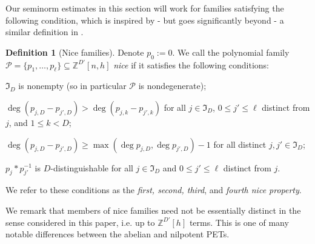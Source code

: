 \documentclass[11pt]{amsart}
\theoremstyle{definition}
\newtheorem{definition}[lemma]{Definition}
\newcommand{\Z}{{\mathbb Z}}
\newcommand{\CP}{{\mathcal P}}
\newcommand{\FI}{{\mathfrak I}}
\newcommand{\1}{{\mathbf{1}}}
\begin{document}
Our seminorm estimates in this section will work for families satisfying the following condition, which is inspired by - but goes significantly beyond - a similar definition in \cite[Section 5.2.1]{CFH11}. %
\begin{definition}[Nice families]\label{D: nice families}
Denote $p_{0}:=0$.
    We call the polynomial family $\CP= \{p_1, \ldots, p_\ell\}\subseteq\Z^{D'}[n, h]$ \textit{nice} if it satisfies the following conditions: 
    \begin{enumerate}
        \item $\FI_D$ is nonempty (so in particular $\CP$ is nondegenerate);
        \item $\deg (p_{j,D}-p_{j',D}) > \deg (p_{j,k}-p_{j',k})$ for all $j\in\FI_D$, ${0}\leq j'\leq \ell$ distinct from $j$, and $1\leq k <D$;
        {\item $\deg (p_{j,D}-p_{j',D})\geq \max(\deg p_{j,D}, \deg p_{j',D})-1$ for all distinct $j,j'\in\FI_D$;}
        \item $p_{j}\ast p_{j'}^{-1}$ is $D$-distinguishable for all $j\in \FI_D$ and $0\leq j'\leq \ell$ distinct from $j$. %
    \end{enumerate}
    We refer to these conditions as the \textit{first, second, third}, and \textit{fourth nice property}.
\end{definition}
We remark that members of nice families need not be essentially distinct in the sense considered in this paper, i.e. up to $\Z^{D'}[h]$ terms. This is one of many notable differences between the abelian and nilpotent PETs.
\end{document}
